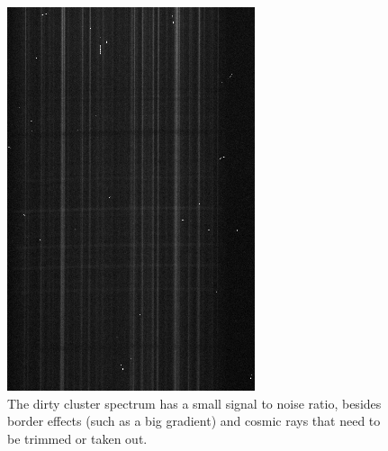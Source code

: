 \begin{figure}[H]
  \centering
  \begin{minipage}[b]{0.49\textwidth}
    \includegraphics[width=\textwidth]{images/cluster_dirty.png}
    \caption[Dirty spectrum of NGC5139]{The dirty cluster spectrum has a small signal to noise ratio, besides border effects (such as a big gradient) and cosmic rays that need to be trimmed or taken out.}
  \end{minipage}
  \hfill
  \begin{minipage}[b]{0.49\textwidth}

\end{minipage}
\end{figure}
